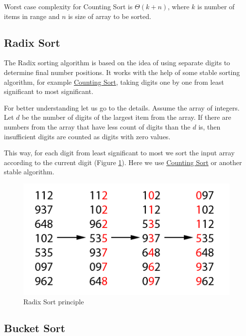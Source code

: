 \documentclass[
  field=inf,
  biblatex,
  language=english,
  glossaries,
  theorems=false,
  sourcecodes=false,
  index
]{kidiplom}
\begin{document}
Worst case complexity for Counting Sort is $\Theta(k + n)$, where $k$ is number of items in range and $n$ is size of array to be sorted.

\subsection{Radix Sort}
\label{sec:radixsort}

The Radix sorting algorithm is based on the idea of using separate digits to determine final number positions. It works with the help of some stable sorting algorithm, for example \hyperref[sec:counting]{Counting Sort}, taking digits one by one from least significant to most significant.

For better understanding let us go to the details. Assume the array of integers. Let $d$ be the number of digits of the largest item from the array. If there are numbers from the array that have less count of digits than the $d$ is, then insufficient digits are counted as digits with zero values.

This way, for each digit from least significant to most we sort the input array according to the current digit (Figure \ref{fig:radixsort}). Here we use \hyperref[sec:counting]{Counting Sort} or another stable algorithm.

\begin{figure}[H]
\begin{center}
	
	\includegraphics[scale=2]{img/Radixsort.png}
	\caption{Radix Sort principle}\label{fig:radixsort}
\end{center}
\end{figure}

\subsection{Bucket Sort}
\label{sec:bucketsort}
\end{document}
